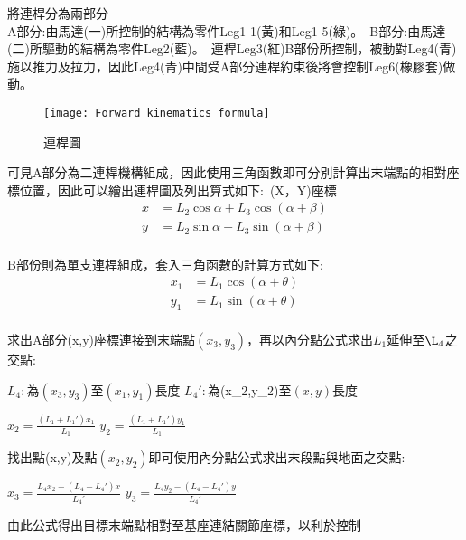 將連桿分為兩部分\\
A部分:由馬達(一)所控制的結構為零件Leg1-1(黃)和Leg1-5(綠)。\
B部分:由馬達(二)所驅動的結構為零件Leg2(藍)。\
連桿Leg3(紅)B部份所控制，被動對Leg4(青)施以推力及拉力，因此Leg4(青)中間受A部分連桿約束後將會控制Leg6(橡膠套)做動。\\


\begin{figure}[hbt!]
\begin{center}
\texttt{[image: Forward kinematics formula]}
\caption{\Large 連桿圖}\label{Forward kinematics formula}
\end{center}
\end{figure}

可見A部分為二連桿機構組成，因此使用三角函數即可分別計算出末端點的相對座標位置，因此可以繪出連桿圖及列出算式如下:\
(X，Y)座標
\[
\begin{aligned}
x&=L_{2}\cos \alpha +L_{3}\cos \left( \alpha +\beta \right)\\
y&=L_{2}\sin \alpha +L_{3}\sin \left( \alpha +\beta \right)\\
\end{aligned}
\]

B部份則為單支連桿組成，套入三角函數的計算方式如下:\\
\[
\begin{aligned}
x_{1}&=L_{1}\cos \left( \alpha +\theta \right)\\
y_{1}&=L_{1}\sin \left( \alpha +\theta \right)\\
\end{aligned}
\]

求出A部分(x,y)座標連接到末端點$(x_3,y_3)$，再以內分點公式求出$L_1$延伸至$\L_4$之交點:\\
\begin{center}
$L_4:為(x_3,y_3)至(x_1,y_1)長度$
$L_4':為$(x_2,y_2)$至(x,y)長度$
\end{center}
\begin{center}
$x_2= \frac{(L_{1} + L_{1}') x_{1}}{L_{1}}$
$y_2= \frac{(L_{1} + L_{1}') y_{1}}{L_{1}}$
\end{center}
找出點(x,y)及點$(x_2,y_2)$即可使用內分點公式求出末段點與地面之交點:\\
\begin{center}
$x_3= \frac{L_{4} x_{2} - (L_{4} - L_{4}') x}{L_{4}'}$
$y_3= \frac{L_{4} y_{2} - (L_{4} - L_{4}') y}{L_{4}'}$
\end{center}
由此公式得出目標末端點相對至基座連結關節座標，以利於控制\\

